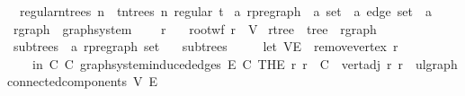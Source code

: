 \begin{isabellebody}
\ \ {\isachardoublequoteopen}regular{\isacharunderscore}{\kern0pt}n{\isacharunderscore}{\kern0pt}trees\ n\ {\isacharequal}{\kern0pt}\ {\isacharbraceleft}{\kern0pt}t{\isasymin}n{\isacharunderscore}{\kern0pt}trees\ n{\isachardot}{\kern0pt}\ regular\ t{\isacharbraceright}{\kern0pt}{\isachardoublequoteclose}%
\isadelimdocument
%
\endisadelimdocument
%
\isatagdocument
%
\isamarkuptrue%
%
\endisatagdocument
{\isafolddocument}%
%
\isadelimdocument
%
\endisadelimdocument
{}\isamarkupfalse%
\ {\isacharprime}{\kern0pt}a\ rpregraph\ {\isacharequal}{\kern0pt}\ {\isachardoublequoteopen}{\isacharparenleft}{\kern0pt}{\isacharprime}{\kern0pt}a\ set{\isacharparenright}{\kern0pt}\ {\isasymtimes}\ {\isacharparenleft}{\kern0pt}{\isacharprime}{\kern0pt}a\ edge\ set{\isacharparenright}{\kern0pt}\ {\isasymtimes}\ {\isacharprime}{\kern0pt}a{\isachardoublequoteclose}\ \isanewline
\isanewline
{}\isamarkupfalse%
\ rgraph\ {\isacharequal}{\kern0pt}\ graph{\isacharunderscore}{\kern0pt}system\ {\isacharplus}{\kern0pt}\isanewline
\ \ \ r\isanewline
\ \ \ root{\isacharunderscore}{\kern0pt}wf{\isacharcolon}{\kern0pt}\ {\isachardoublequoteopen}r\ {\isasymin}\ V{\isachardoublequoteclose}\isanewline
\isanewline
{}\isamarkupfalse%
\ rtree\ {\isacharequal}{\kern0pt}\ tree\ {\isacharplus}{\kern0pt}\ rgraph\isanewline
{}\isanewline
\isanewline
{}\isamarkupfalse%
\ subtrees\ {\isacharcolon}{\kern0pt}{\isacharcolon}{\kern0pt}\ {\isachardoublequoteopen}{\isacharprime}{\kern0pt}a\ rpregraph\ set{\isachardoublequoteclose}\ \isanewline
\ \ {\isachardoublequoteopen}subtrees\ {\isacharequal}{\kern0pt}\isanewline
\ \ \ \ {\isacharparenleft}{\kern0pt}let\ {\isacharparenleft}{\kern0pt}V{\isacharprime}{\kern0pt}{\isacharcomma}{\kern0pt}E{\isacharprime}{\kern0pt}{\isacharparenright}{\kern0pt}\ {\isacharequal}{\kern0pt}\ remove{\isacharunderscore}{\kern0pt}vertex\ r\isanewline
\ \ \ \ in\ {\isacharparenleft}{\kern0pt}{\isasymlambda}C{\isachardot}{\kern0pt}\ {\isacharparenleft}{\kern0pt}C{\isacharcomma}{\kern0pt}\ graph{\isacharunderscore}{\kern0pt}system{\isachardot}{\kern0pt}induced{\isacharunderscore}{\kern0pt}edges\ E{\isacharprime}{\kern0pt}\ C{\isacharcomma}{\kern0pt}\ THE\ r{\isacharprime}{\kern0pt}{\isachardot}{\kern0pt}\ r{\isacharprime}{\kern0pt}\ {\isasymin}\ C\ {\isasymand}\ vert{\isacharunderscore}{\kern0pt}adj\ r\ r{\isacharprime}{\kern0pt}{\isacharparenright}{\kern0pt}{\isacharparenright}{\kern0pt}\ {\isacharbackquote}{\kern0pt}\ ulgraph{\isachardot}{\kern0pt}connected{\isacharunderscore}{\kern0pt}components\ V{\isacharprime}{\kern0pt}\ E{\isacharprime}{\kern0pt}{\isacharparenright}{\kern0pt}{\isachardoublequoteclose}\isanewline

\end{isabellebody}
